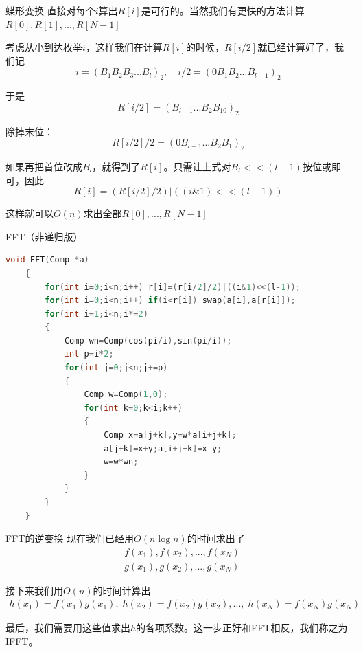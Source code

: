 \documentclass{beamer}
\begin{document}
\begin{frame}{蝶形变换}
    直接对每个$i$算出$R[i]$是可行的。当然我们有更快的方法计算$R[0],R[1],...,R[N-1]$

    \pause
    考虑从小到达枚举$i$，这样我们在计算$R[i]$的时候，$R[i/2]$就已经计算好了，我们记
    \begin{equation*}
        i=(B_1B_2B_3...B_l)_2,\quad i/2=(0B_1B_2...B_{l-1})_2
    \end{equation*}

    于是
    \begin{equation*}
        R[i/2]=(B_{l-1}...B_2B_10)_2
    \end{equation*}

    \pause
    除掉末位：
    \begin{equation*}
        R[i/2]/2=(0B_{l-1}...B_2B_1)_2
    \end{equation*}

    \pause
    如果再把首位改成$B_l$，就得到了$R[i]$。只需让上式对$B_l<<(l-1)$按位或即可，因此
    \begin{equation*}
        R[i]=(R[i/2]/2)|((i\&1)<<(l-1))
    \end{equation*}

    这样就可以$O(n)$求出全部$R[0],...,R[N-1]$
\end{frame}

\begin{frame}[fragile]{FFT（非递归版）}
    \begin{lstlisting}[language=c++]
    void FFT(Comp *a)
    {
        for(int i=0;i<n;i++) r[i]=(r[i/2]/2)|((i&1)<<(l-1));
        for(int i=0;i<n;i++) if(i<r[i]) swap(a[i],a[r[i]]);
        for(int i=1;i<n;i*=2)
        {
            Comp wn=Comp(cos(pi/i),sin(pi/i));
            int p=i*2;
            for(int j=0;j<n;j+=p)
            {
                Comp w=Comp(1,0);
                for(int k=0;k<i;k++)
                {
                    Comp x=a[j+k],y=w*a[i+j+k];
                    a[j+k]=x+y;a[i+j+k]=x-y;
                    w=w*wn;
                }
            }
        }
    }
    \end{lstlisting}
\end{frame}

\begin{frame}{FFT的逆变换}
    现在我们已经用$O(n\log n)$的时间求出了
    \begin{align*}
        & f(x_1), f(x_2), ..., f(x_N)\\
        & g(x_1), g(x_2), ..., g(x_N)
    \end{align*}

    接下来我们用$O(n)$的时间计算出
    \begin{align*}
        h(x_1)=f(x_1)g(x_1),\;h(x_2)=f(x_2)g(x_2),...,\;h(x_N)=f(x_N)g(x_N)
    \end{align*}

    最后，我们需要用这些值求出$h$的各项系数。这一步正好和FFT相反，我们称之为IFFT。
\end{frame}
\end{document}
